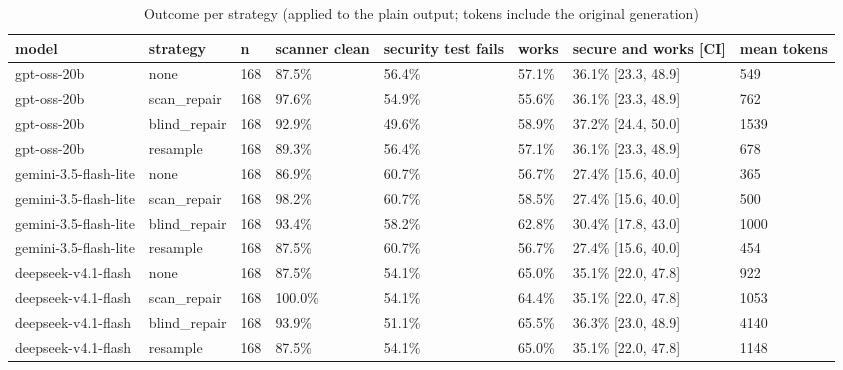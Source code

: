 \begin{table}[t]\centering\small
\caption{Outcome per strategy (applied to the plain output; tokens include the original generation)}
\begin{tabular}{llllllll}
\toprule
model & strategy & n & scanner clean & security test fails & works & secure and works [CI] & mean tokens \\
\midrule
gpt-oss-20b & none & 168 & 87.5\% & 56.4\% & 57.1\% & 36.1\% [23.3, 48.9] & 549 \\
gpt-oss-20b & scan\_repair & 168 & 97.6\% & 54.9\% & 55.6\% & 36.1\% [23.3, 48.9] & 762 \\
gpt-oss-20b & blind\_repair & 168 & 92.9\% & 49.6\% & 58.9\% & 37.2\% [24.4, 50.0] & 1539 \\
gpt-oss-20b & resample & 168 & 89.3\% & 56.4\% & 57.1\% & 36.1\% [23.3, 48.9] & 678 \\
gemini-3.5-flash-lite & none & 168 & 86.9\% & 60.7\% & 56.7\% & 27.4\% [15.6, 40.0] & 365 \\
gemini-3.5-flash-lite & scan\_repair & 168 & 98.2\% & 60.7\% & 58.5\% & 27.4\% [15.6, 40.0] & 500 \\
gemini-3.5-flash-lite & blind\_repair & 168 & 93.4\% & 58.2\% & 62.8\% & 30.4\% [17.8, 43.0] & 1000 \\
gemini-3.5-flash-lite & resample & 168 & 87.5\% & 60.7\% & 56.7\% & 27.4\% [15.6, 40.0] & 454 \\
deepseek-v4.1-flash & none & 168 & 87.5\% & 54.1\% & 65.0\% & 35.1\% [22.0, 47.8] & 922 \\
deepseek-v4.1-flash & scan\_repair & 168 & 100.0\% & 54.1\% & 64.4\% & 35.1\% [22.0, 47.8] & 1053 \\
deepseek-v4.1-flash & blind\_repair & 168 & 93.9\% & 51.1\% & 65.5\% & 36.3\% [23.0, 48.9] & 4140 \\
deepseek-v4.1-flash & resample & 168 & 87.5\% & 54.1\% & 65.0\% & 35.1\% [22.0, 47.8] & 1148 \\
\bottomrule
\end{tabular}
\end{table}

